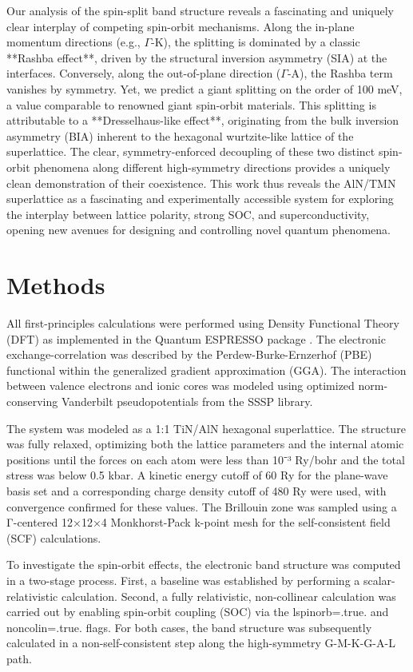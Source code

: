 \documentclass[aps,prl,reprint,superscriptaddress]{revtex4-2}
\begin{document}
Our analysis of the spin-split band structure reveals a fascinating and
uniquely clear interplay of competing spin-orbit mechanisms. Along the in-plane
momentum directions (e.g., $\Gamma$-K), the splitting is dominated by a classic
**Rashba effect**, driven by the structural inversion asymmetry (SIA) at the
interfaces. Conversely, along the out-of-plane direction ($\Gamma$-A), the
Rashba term vanishes by symmetry. Yet, we predict a giant splitting on the
order of 100 meV, a value comparable to renowned giant spin-orbit materials.
This splitting is attributable to a **Dresselhaus-like effect**, originating
from the bulk inversion asymmetry (BIA) inherent to the hexagonal wurtzite-like
lattice of the superlattice. The clear, symmetry-enforced decoupling of these
two distinct spin-orbit phenomena along different high-symmetry directions
provides a uniquely clean demonstration of their coexistence. This work thus
reveals the AlN/TMN superlattice as a fascinating and experimentally accessible
system for exploring the interplay between lattice polarity, strong SOC, and
superconductivity, opening new avenues for designing and controlling novel
quantum phenomena.

\section{Methods}

All first-principles calculations were performed using Density Functional
Theory (DFT) as implemented in the Quantum ESPRESSO package
\cite{giannozzi_quantum_2009}. The electronic exchange-correlation was
described by the Perdew-Burke-Ernzerhof (PBE) functional within the generalized
gradient approximation (GGA). The interaction between valence electrons and
ionic cores was modeled using optimized norm-conserving Vanderbilt
pseudopotentials from the SSSP library.

The system was modeled as a 1:1 TiN/AlN hexagonal superlattice. The structure
was fully relaxed, optimizing both the lattice parameters and the internal
atomic positions until the forces on each atom were less than 10⁻³ Ry/bohr and
the total stress was below 0.5 kbar. A kinetic energy cutoff of 60 Ry for the
plane-wave basis set and a corresponding charge density cutoff of 480 Ry were
used, with convergence confirmed for these values. The Brillouin zone was
sampled using a Γ-centered 12×12×4 Monkhorst-Pack k-point mesh for the
self-consistent field (SCF) calculations.

To investigate the spin-orbit effects, the electronic band structure was
computed in a two-stage process. First, a baseline was established by
performing a scalar-relativistic calculation. Second, a fully relativistic,
non-collinear calculation was carried out by enabling spin-orbit coupling (SOC)
via the lspinorb=.true. and noncolin=.true. flags. For both cases, the band
structure was subsequently calculated in a non-self-consistent step along the
high-symmetry G-M-K-G-A-L path.
\end{document}
